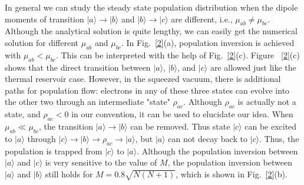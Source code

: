 \documentclass{article}
\begin{document}
In general we can study the steady state population distribution when the dipole moments of transition $|a\rangle\rightarrow|b\rangle$ and $|b\rangle\rightarrow|c\rangle$ are different, i.e., $\mu_{ab}\ne\mu_{bc}$. Although the analytical solution is quite lengthy, we can easily get the numerical solution for different $\mu_{ab}$ and $\mu_{bc}$. In Fig.~\ref{2}(a), population inversion is achieved with $\mu_{ab}<\mu_{bc}$. This can be interpreted with the help of Fig.~\ref{2}(c). Figure ~\ref{2}(c) shows that the direct transition between $|a\rangle$, $|b\rangle$, and $|c\rangle$ are allowed just like the thermal reservoir case. However, in the squeezed vacuum, there is additional paths for population flow: electrons in any of these three states can evolve into the other two through an intermediate "state" $\rho_{ac}$. Although $\rho_{ac}$ is actually not a state, and $\rho_{ac}<0$ in our convention, it can be used to elucidate our idea. When $\mu_{ab}\ll\mu_{bc}$, the transition $|a\rangle\rightarrow|b\rangle$ can be removed. Thus state $|c\rangle$ can be excited to $|a\rangle$ through $|c\rangle\rightarrow|b\rangle\rightarrow\rho_{ac}\rightarrow|a\rangle$, but $|a\rangle$ can not decay back to $|c\rangle$. Thus, the population is trapped from $|c\rangle$ to $|a\rangle$. Although the population inversion between $|a\rangle$ and $|c\rangle$ is very sensitive to the value of $M$, the population inversion between $|a\rangle$ and $|b\rangle$ still holds for $M=0.8\sqrt{N(N+1)}$, which is shown in Fig.~\ref{2}(b).
\end{document}
